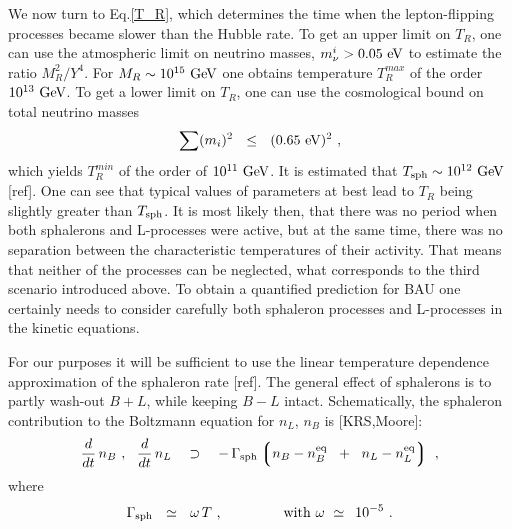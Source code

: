 \documentclass[12pt]{revtex4}
\newcommand{\eq}{{\rm eq}}
\newcommand{\lgr}{\left\lgroup}
\newcommand{\rgr}{\right\rgroup}
\newcommand{\Tsph}{T_{\rm sph}}
\newcommand{\Gsph}{\Gamma_{\rm sph}}
\newcommand{\GeV}{{\rm GeV}}
\newcommand{\eV}{{\rm eV}}
\begin{document}
	We now turn to Eq.\eqref{T_R}, which determines the time when
	the lepton-flipping processes became slower than the Hubble
	rate.
	To get an upper limit on $ T_R $, one can use the atmospheric
	limit on neutrino masses, $ m_\nu^i > 0.05~\eV $ 
	to estimate the ratio $ M_R^2 / Y^4 $.
	For $ M_R \sim 10^{15}~\GeV $ one obtains temperature $ T_R^{max} $ 
	of the order $ 10^{13}~\GeV $.
	To get a lower limit on $ T_R $, one can use the cosmological
	bound on total neutrino masses
\[
	\sum (m_i)^2 ~~\leq~~ (0.65~\eV)^2~,
\]
	which yields $ T_R^{min} $ of the order of $ 10^{11}~\GeV $. 
	It is estimated that $ \Tsph \sim 10^{12}~\GeV $ [ref]. 
	One can see that typical values of parameters at best 
	lead to $ T_R $ being slightly greater than $ \Tsph $.
	It is most likely then, that there was no period when
	both sphalerons and L-processes were active, but at the same
	time, there was no separation between the characteristic 
	temperatures of their activity.
	That means that neither of the processes can be neglected,
	what corresponds to the third scenario introduced above.
	To obtain a quantified prediction for BAU one certainly needs
	to consider carefully both sphaleron processes and L-processes
	in the kinetic equations.

	For our purposes it will be sufficient to use the linear
	temperature dependence approximation of the sphaleron rate [ref]. 
	The general effect of sphalerons is to partly wash-out $ B + L $,
	while keeping $ B - L $ intact.
	Schematically, the sphaleron contribution to the Boltzmann equation
	for $ n_L $, $ n_B $ is [KRS,Moore]:
\begin{equation}
\label{sph_corr}
	\frac{d}{dt}\, n_B~,~~
	\frac{d}{dt}\, n_L
	~~~\supset~~~ -\, \Gsph 
		\lgr   n_B - n_B^\eq \;~+~\;
		       n_L - n_L^\eq 
		\rgr~,
\end{equation}
	where
\[
	\Gsph ~~\simeq~~ \omega\, T~, \qquad\qquad 
	{\rm ~with~}
	\omega ~\simeq~ \,10^{-5}~.
\]
\end{document}
